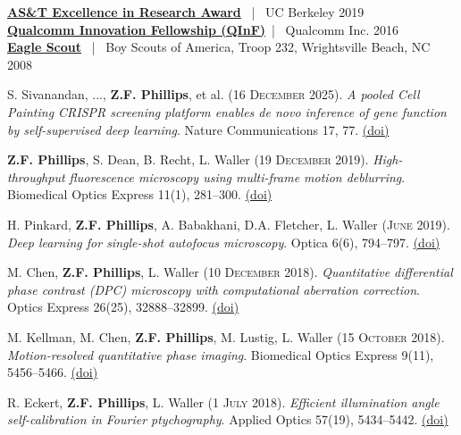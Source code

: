 \documentclass[12pt,letterpaper]{article}
\newcommand{\mhead}[1]{\leavevmode\marginpar{\raggedright\sffamily\footnotesize #1}}
\newcommand{\rdate}[1]{{} \hfill #1}
\renewcommand{\date}[1]{#1}
\begin{document}
\smallskip
\mhead{Awards and \newline Affiliations}%
\textbf{\href{https://www.laurawaller.com/5-1-19-zack-wins-ast-excellence-in-research-award/}{AS\&T Excellence in Research Award}} ~|~  UC Berkeley \rdate{2019}\\
\textbf{\href{https://www.qualcomm.com/research/university-relations/innovation-fellowship/winners}{Qualcomm Innovation Fellowship (QInF)}}~|~ Qualcomm Inc.                  \rdate{2016}\\
\textbf{\href{https://troop232wb.org/about-us/}{Eagle Scout}} ~|~ Boy Scouts of America, Troop 232, Wrightsville Beach, NC \rdate{2008}

\newpage
\raggedright
\mhead{Publications}%
\par\vspace{-\baselineskip}

\medskip
S. Sivanandan, ..., \textbf{Z.F. Phillips}, et al. (\date{16 \textsc{December} 2025}). \emph{A pooled Cell Painting CRISPR screening platform enables de novo inference of gene function by self-supervised deep learning}. Nature Communications 17, 77. \href{https://doi.org/10.1038/s41467-025-66778-6}{(doi)}

\medskip
\textbf{Z.F. Phillips}, S. Dean, B. Recht, L. Waller (\date{19 \textsc{December} 2019}). \emph{High-throughput fluorescence microscopy using multi-frame motion deblurring}. Biomedical Optics Express 11(1), 281--300. \href{https://doi.org/10.1364/BOE.11.000281}{(doi)}

\medskip
H. Pinkard, \textbf{Z.F. Phillips}, A. Babakhani, D.A. Fletcher, L. Waller (\date{\textsc{June} 2019}). \emph{Deep learning for single-shot autofocus microscopy}. Optica 6(6), 794--797. \href{https://doi.org/10.1364/OPTICA.6.000794}{(doi)}

\medskip
M. Chen, \textbf{Z.F. Phillips}, L. Waller (\date{10 \textsc{December} 2018}). \emph{Quantitative differential phase contrast (DPC) microscopy with computational aberration correction}. Optics Express 26(25), 32888--32899. \href{https://doi.org/10.1364/OE.26.032888}{(doi)}

\medskip
M. Kellman, M. Chen, \textbf{Z.F. Phillips}, M. Lustig, L. Waller (\date{15 \textsc{October} 2018}). \emph{Motion-resolved quantitative phase imaging}. Biomedical Optics Express 9(11), 5456--5466. \href{https://doi.org/10.1364/BOE.9.005456}{(doi)}

\medskip
R. Eckert, \textbf{Z.F. Phillips}, L. Waller (\date{1 \textsc{July} 2018}). \emph{Efficient illumination angle self-calibration in Fourier ptychography}. Applied Optics 57(19), 5434--5442. \href{https://doi.org/10.1364/AO.57.005434}{(doi)}
\end{document}
